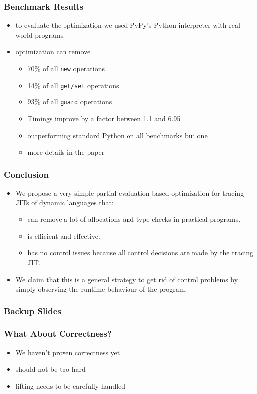 \documentclass[utf8x]{beamer}
\begin{document}
\begin{frame}
  \frametitle{Benchmark Results}
  \begin{itemize}
      \item to evaluate the optimization we used PyPy's Python interpreter with real-world programs
      \item optimization can remove
      \begin{itemize}
          \item 70\% of all \texttt{new} operations
          \item 14\% of all \texttt{get/set} operations
          \item 93\% of all \texttt{guard} operations
      \pause
      \item Timings improve by a factor between 1.1 and 6.95
      \item outperforming standard Python on all benchmarks but one
      \pause
      \item more details in the paper
      \end{itemize}
  \end{itemize}
\end{frame}

\begin{frame}
  \frametitle{Conclusion}
  \begin{itemize}
      \item We propose a very simple partial-evaluation-based optimization for tracing
      JITs of dynamic languages that:
      \begin{itemize}
          \item can remove a lot of allocations and type checks in practical
          programs. 
          \item is efficient and effective.
          \item has no control issues because all control decisions are made by
          the tracing JIT.
      \end{itemize}
      \pause
      \item We claim that this is a general strategy to get rid of control
      problems by simply observing the runtime behaviour of the program.
  \end{itemize}
\end{frame}


\begin{frame}
  \frametitle{Backup Slides}
\end{frame}

\begin{frame}
  \frametitle{What About Correctness?}
  \begin{itemize}
      \item We haven't proven correctness yet
      \item should not be too hard
      \item lifting needs to be carefully handled
  \end{itemize}
\end{frame}
\end{document}
